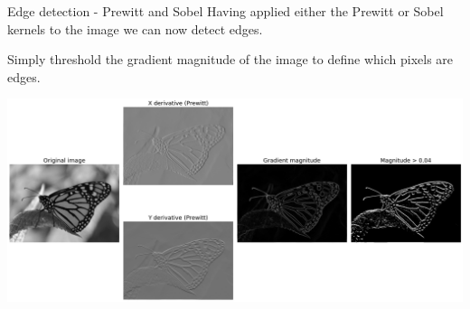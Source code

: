 \documentclass[9pt, aspectratio=169]{beamer}
\begin{document}
\begin{frame}
    {Edge detection - Prewitt and Sobel}
    Having applied either the Prewitt or Sobel kernels to the image we can now detect edges.

    Simply threshold the gradient magnitude of the image to define which pixels are edges.

    \centering
    \includegraphics[width=.7\textwidth]{monarch_prewitt.png}
\end{frame}
\end{document}
